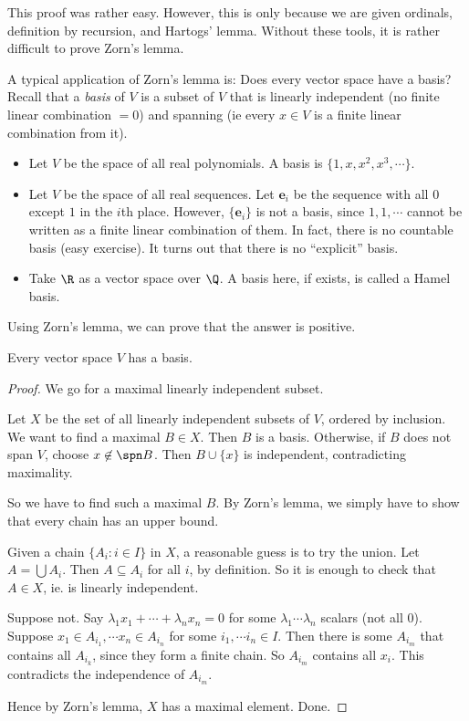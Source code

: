 \documentclass[a4paper]{article}
\begin{document}
This proof was rather easy. However, this is only because we are given ordinals, definition by recursion, and Hartogs' lemma. Without these tools, it is rather difficult to prove Zorn's lemma.

A typical application of Zorn's lemma is: Does every vector space have a basis? Recall that a \emph{basis} of $V$ is a subset of $V$ that is linearly independent (no finite linear combination $= 0$) and spanning (ie every $x\in V$ is a finite linear combination from it).

\begin{eg}\leavevmode
  \begin{itemize}
    \item Let $V$ be the space of all real polynomials. A basis is $\{1, x, x^2, x^3, \cdots\}$.
    \item Let $V$ be the space of all real sequences. Let $\mathbf{e}_i$ be the sequence with all $0$ except $1$ in the $i$th place. However, $\{\mathbf{e}_i\}$ is not a basis, since $1, 1, \cdots$ cannot be written as a finite linear combination of them. In fact, there is no countable basis (easy exercise). It turns out that there is no ``explicit'' basis.
    \item Take $\R$ as a vector space over $\Q$. A basis here, if exists, is called a Hamel basis.
  \end{itemize}
\end{eg}

Using Zorn's lemma, we can prove that the answer is positive.
\begin{thm}
  Every vector space $V$ has a basis.
\end{thm}

\begin{proof}
  We go for a maximal linearly independent subset.

  Let $X$ be the set of all linearly independent subsets of $V$, ordered by inclusion. We want to find a maximal $B\in X$. Then $B$ is a basis. Otherwise, if $B$ does not span $V$, choose $x\not\in \spn B$. Then $B\cup \{x\}$ is independent, contradicting maximality.

  So we have to find such a maximal $B$. By Zorn's lemma, we simply have to show that every chain has an upper bound.

  Given a chain $\{A_i: i\in I\}$ in $X$, a reasonable guess is to try the union. Let $A = \bigcup A_i$. Then $A\subseteq A_i$ for all $i$, by definition. So it is enough to check that $A\in X$, ie. is linearly independent.

  Suppose not. Say $\lambda_1x_1 + \cdots + \lambda_nx_n = 0$ for some $\lambda_1 \cdots \lambda_n$ scalars (not all $0$). Suppose $x_1 \in A_{i_1}, \cdots x_n \in A_{i_n}$ for some $i_1, \cdots i_n \in I$. Then there is some $A_{i_m}$ that contains all $A_{i_k}$, since they form a finite chain. So $A_{i_m}$ contains all $x_i$. This contradicts the independence of $A_{i_m}$.

  Hence by Zorn's lemma, $X$ has a maximal element. Done.
\end{proof}
\end{document}
